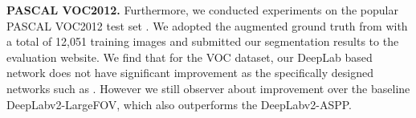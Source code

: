 \documentclass[runningheads]{llncs}
\begin{document}
\begin{table}[h]
\centering
{}
\caption{Comparison of the mean IoU scores () of several benchmarking 
methods for the PASCAL PERSON-Part dataset.}\label{tab:person}
\end{table}



{\bf PASCAL VOC2012.} Furthermore, we conducted experiments on the popular
PASCAL VOC2012 test set \cite{Everingham10}. We adopted the augmented
ground truth from \cite{hariharan2014simultaneous} with a total of
12,051 training images and submitted our segmentation results to the
evaluation website. We find that for the VOC dataset, our DeepLab based network
does not have significant improvement as the specifically designed networks such as 
\cite{lin2016refinenet,zhao2016pyramid}.  However we still observer
about  improvement over the baseline DeepLabv2-LargeFOV,
which also outperforms the DeepLabv2-ASPP. 
\end{document}
